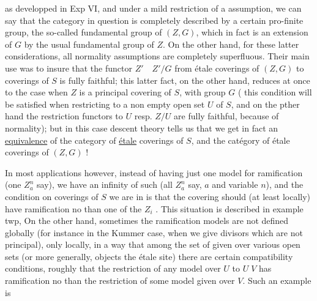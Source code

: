 as developped in Exp VI, and under a mild restriction  of a  assumption, we can say that the category in question is  completely described by a certain pro-finite group, the so-called fundamental group of $(Z,G)$, which in fact is an extension of $G$ by the usual fundamental group of $Z$. On the other hand, for these latter considerations, all normality assumptions are completely superfluous. Their main use was to insure that the functor $Z'\quad Z'/G$ from étale coverings of $(Z,G)$ to coverings of $S$ is fully faithful; this latter fact, on the other hand, reduces at once to the case when $Z$ is a principal covering of $S$, with group $G$ ( this condition will be satisfied when restricting to a non empty open set $U$ of $S$, and on the pther hand the restriction functors  to $U$ resp. $Z/U$ are fully faithful, because of normality); but in this case descent theory tells us that we get in fact an \uline{equivalence} of the category of \uline{étale} coverings of $S$, and the catégory of étale coverings of $(Z,G)$ !

In most applications however, instead of having just one model for ramification (one $Z_a^n$ say), we have an infinity of such (all $Z_a^n$ say,  $a$ and variable $n$), and the condition on coverings  of $S$ we are  in is that the covering should (at least locally) have ramification no  than one of the $Z_i$ . This situation is described in example twp, On the other hand, sometimes the ramification models are not defined globally (for instance in the Kummer case, when we give  divisors which are not principal), only locally, in a way that among the set of  given over various open sets (or more generally, objects  the étale site) there are certain compatibility conditions, roughly that the restriction of any model over $U$ to $U\;V$ has ramification no  than the restriction of some model given over $V$. Such an example is

